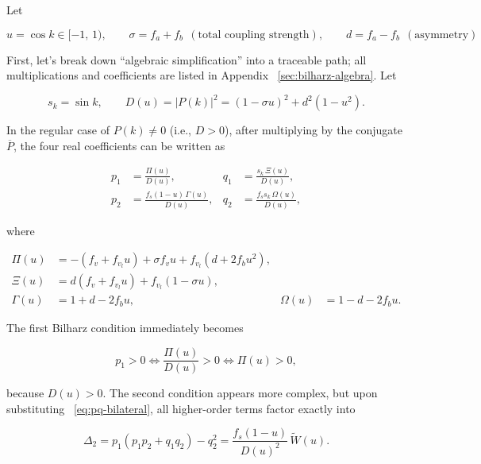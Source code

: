 \documentclass[11pt,a4paper,openany]{book}
\numberwithin{equation}{chapter}
\numberwithin{figure}{chapter}
\numberwithin{table}{chapter}
\begin{document}
\label{sub:twocond}




Let

\begin{equation}
u = \cos k \in [-1,\,1),
\qquad
\sigma = f_a+f_b \ \ (\text{total coupling strength}),
\qquad
d = f_a-f_b \ \ (\text{asymmetry})
\end{equation}




First, let’s break down “algebraic simplification” into a traceable path; all multiplications and coefficients are listed in Appendix ~\ref{sec:bilharz-algebra}. Let

\begin{equation}
s_k=\sin k,
\qquad
D(u)=|P(k)|^2=(1-\sigma u)^2+d^2(1-u^2).
\label{eq:D-bilateral}
\end{equation}

In the regular case of $P(k)\ne0$ (i.e., $D>0$), after multiplying by the conjugate $\overline P$, the four real coefficients can be written as

\begin{align}
p_1&=\frac{\Pi(u)}{D(u)},
&q_1&=\frac{s_k\,\Xi(u)}{D(u)},\\
p_2&=\frac{f_s(1-u)\,\Gamma(u)}{D(u)},
&q_2&=\frac{f_ss_k\,\Omega(u)}{D(u)},
\label{eq:pq-bilateral}
\end{align}

where

\begin{align}
\Pi(u)&=-\left(f_v+f_{v_l}u\right)+\sigma f_vu+f_{v_l}\left(d+2f_bu^2\right),\\
\Xi(u)&=d\left(f_v+f_{v_l}u\right)+f_{v_l}(1-\sigma u),\\
\Gamma(u)&=1+d-2f_bu,
&\Omega(u)&=1-d-2f_bu.
\label{eq:aux-bilateral}
\end{align}




The first Bilharz condition immediately becomes

\begin{equation}
p_1>0
\iff
\frac{\Pi(u)}{D(u)}>0
\iff
\Pi(u)>0,
\end{equation}

because $D(u)>0$. The second condition appears more complex, but upon substituting ~\eqref{eq:pq-bilateral}, all higher-order terms factor exactly into

\begin{equation}
\Delta_2
=p_1(p_1p_2+q_1q_2)-q_2^2
=\frac{f_s(1-u)}{D(u)^2}\,\widetilde W(u).
\label{eq:Delta-factor}
\end{equation}
\end{document}
